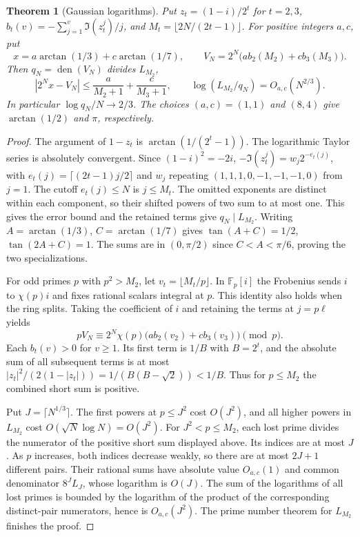 \documentclass[11pt]{article}
\newtheorem{theorem}{Theorem}[section]
\DeclareMathOperator{\den}{den}
\newcommand{\F}{\mathbb F}
\begin{document}
\begin{theorem}[Gaussian logarithms]\label{th:gauss}
Put $z_t=(1-i)/2^t$ for $t=2,3$, $b_t(v)=-\sum_{j=1}^v\Im(z_t^j)/j$,
and $M_t=\lfloor2N/(2t-1)\rfloor$. For positive integers $a,c$, put
\[
 x=a\arctan(1/3)+c\arctan(1/7),\qquad
 V_N=2^N\bigl(a b_2(M_2)+c b_3(M_3)\bigr).
\]
Then $q_N=\den(V_N)$ divides $L_{M_2}$,
\[
 |2^Nx-V_N|\le\frac{a}{M_2+1}+\frac{c}{M_3+1},\qquad
 \log(L_{M_2}/q_N)=O_{a,c}(N^{2/3}).
\]
In particular $\log q_N/N\to2/3$. The choices $(a,c)=(1,1)$ and $(8,4)$
give $\arctan(1/2)$ and $\pi$, respectively.
\end{theorem}
\begin{proof}
The argument of $1-z_t$ is $\arctan(1/(2^t-1))$. The logarithmic Taylor
series is absolutely convergent. Since $(1-i)^2=-2i$,
$-\Im(z_t^j)=w_j2^{-e_t(j)}$, with $e_t(j)=\lceil(2t-1)j/2\rceil$
and $w_j$ repeating $(1,1,1,0,-1,-1,-1,0)$ from $j=1$.
The cutoff $e_t(j)\le N$ is $j\le M_t$. The omitted exponents are distinct
within each component, so their shifted powers of two sum to at most one.
This gives the error bound and the retained terms give $q_N\mid L_{M_2}$.
Writing $A=\arctan(1/3)$, $C=\arctan(1/7)$ gives
$\tan(A+C)=1/2$, $\tan(2A+C)=1$. The sums are in $(0,\pi/2)$ since
$C<A<\pi/6$, proving the two specializations.

For odd primes $p$ with $p^2>M_2$, let $v_t=\lfloor M_t/p\rfloor$.
In $\F_p[i]$ the Frobenius sends $i$ to $\chi(p)i$ and fixes rational
scalars integral at $p$. This identity also holds when the ring splits.
Taking the coefficient of $i$ and retaining the terms at $j=p\ell$ yields
\[
 pV_N\equiv 2^N\chi(p)\bigl(a b_2(v_2)+c b_3(v_3)\bigr)\pmod p .
\]
Each $b_t(v)>0$ for $v\ge1$. Its first term is $1/B$ with $B=2^t$, and
the absolute sum of all subsequent terms is at most
$|z_t|^2/(2(1-|z_t|))=1/(B(B-\sqrt2))<1/B$.
Thus for $p\le M_2$ the combined short sum is positive.

Put $J=\lceil N^{1/3}\rceil$. The first powers at $p\le J^2$ cost $O(J^2)$,
and all higher powers in $L_{M_2}$ cost $O(\sqrt N\log N)=O(J^2)$.
For $J^2<p\le M_2$, each lost prime divides the numerator of the positive
short sum displayed above. Its indices are at most $J$. As $p$ increases,
both indices decrease weakly, so there are at most $2J+1$ different pairs.
Their rational sums have absolute value $O_{a,c}(1)$ and common denominator
$8^J L_J$, whose logarithm is $O(J)$. The sum of the logarithms of all
lost primes is bounded by the logarithm of the product of the corresponding
distinct-pair numerators, hence is $O_{a,c}(J^2)$. The prime number theorem
for $L_{M_2}$ finishes the proof.
\end{proof}
\end{document}
